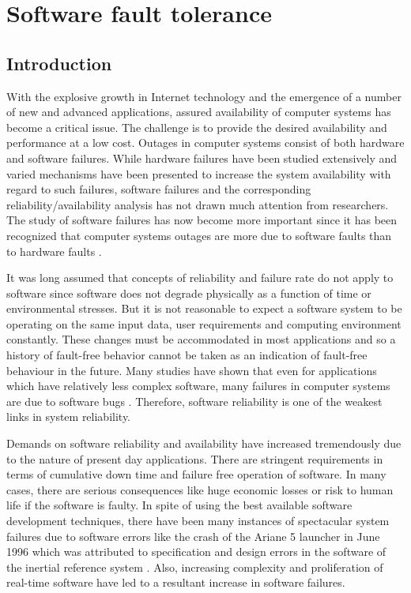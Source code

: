 \documentclass[a4paper, 11pt]{article}
\begin{document}
\section{Software fault tolerance}
\subsection{Introduction}
With the explosive growth in Internet technology and the emergence of a number of new and advanced applications, assured availability of computer systems has become a critical issue. The challenge is to provide the desired availability and performance at a low cost.
Outages in computer systems consist of both hardware and software failures. While hardware failures have been studied extensively and varied mechanisms have been presented to increase the system availability with regard to such failures, software failures and the corresponding reliability/availability analysis has not drawn much attention from researchers. The study of software failures has now become more important since it has been recognized that computer systems outages are more due to software faults than to hardware faults \citep{gray1991high}.

It was long assumed that concepts of reliability and failure rate do not apply to software since software does not degrade physically as a function of time or environmental stresses. But it is not reasonable to expect a software system to be operating on the same input data, user requirements and computing environment constantly. These changes must be accommodated in most applications and so a history of fault-free behavior cannot be taken as an indication of fault-free behaviour in the future. Many studies have shown that even for applications which have relatively less complex software, many failures in computer systems are due to software bugs \citep{pradhan1996fault}. Therefore, software reliability is one of the weakest links in system reliability.

Demands on software reliability and availability have increased tremendously due to the nature of present day applications. There are stringent requirements in terms of cumulative down time and failure free operation of software. In many cases, there are serious consequences like huge economic losses or risk to human life if the software is faulty. In spite of using the best available software development techniques, there have been many instances of spectacular system failures due to software errors like the crash of the Ariane 5 launcher in June 1996 which was attributed to specification and design errors in the software of the inertial reference system \citep{lions1996ariane}. Also, increasing complexity and proliferation of real-time software have led to a resultant increase in software failures.
\end{document}
